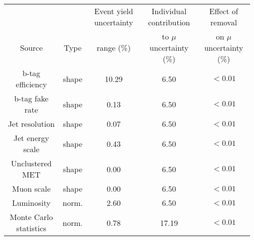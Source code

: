 \documentclass[]{report}
\begin{document}
\begin{landscape}
\begin{Large}
\begin{center}
\begin{tabular}{ccccc} \hline \hline
&  & Event yield uncertainty &Individual contribution & Effect of removal  \\
Source & Type & range (\%) &  to $\mu$ uncertainty (\%) & on $\mu$ uncertainty (\%) \\ \hline 
b-tag efficiency & shape & 10.29 & 6.50 & $<0.01$\\
b-tag fake rate & shape & 0.13 & 6.50 & $<0.01$\\
Jet resolution & shape & 0.07 & 6.50 & $<0.01$\\
Jet energy scale & shape & 0.43 & 6.50 & $<0.01$\\
Unclustered MET & shape & 0.00 & 6.50 & $<0.01$\\
Muon scale & shape & 0.00 & 6.50 & $<0.01$\\
Luminosity & norm. & 2.60 & 6.50 & $<0.01$\\
Monte Carlo statistics & norm. & 0.78 & 17.19 & $<0.01$\\
\hline 
\end{tabular}
\end{center}
\end{Large}
\end{landscape}
\end{document}
